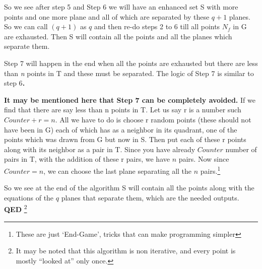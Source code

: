 \documentclass[english]{article}
\begin{document}
So we see after step 5 and Step 6 we will have an enhanced set S with
more points and one more plane and all of which are separated by these
$q+1$ planes. So we can call $(q+1)$ as $q$ and then re-do steps
2 to 6 till all points $N_{f}$ in G are exhausted. Then S will contain
all the points and all the planes which separate them.

Step 7 will happen in the end when all the points are exhausted but
there are less than\textit{ n }points in T and these must be separated.\textbf{
}The logic of Step 7 is similar to step 6\textbf{.}

\textbf{It may be mentioned here that Step 7 can be completely avoided.}
If we find that there are say less than n points in T. Let us say
r is a number such $Counter+r=n$. All we have to do is choose r random
points (these should not have been in G) each of which has as a neighbor
in its quadrant, one of the points which was drawn from G but now
in S. Then put each of these r points along with its neighbor as a
pair in T. Since you have already $Counter$ number of pairs in T,
with the addition of these r pairs, we have $n$ pairs. Now since
$Counter=n$, we can choose the last plane separating all the $n$
pairs.\footnote{These are just `End-Game', tricks that can make programming simpler}

So we see at the end of the algorithm S will contain all the points
along with the equations of the $q$ planes that separate them,\textbf{
}which are the needed outputs. \textbf{QED} \footnote{It may be noted that this algorithm is non iterative, and every point
is mostly {}``looked at'' only once.}
\end{document}
